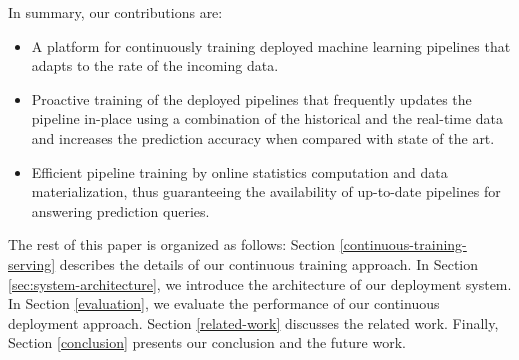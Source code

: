 In summary, our contributions are:
\begin{itemize}
\item A platform for continuously training deployed machine learning pipelines that adapts to the rate of the incoming data.
\item Proactive training of the deployed pipelines that frequently updates the pipeline in-place using a combination of the historical and the real-time data and increases the prediction accuracy when compared with state of the art.
\item Efficient pipeline training by online statistics computation and data materialization, thus guaranteeing the availability of up-to-date pipelines for answering prediction queries.
\end{itemize}

The rest of this paper is organized as follows:
Section \ref{continuous-training-serving} describes the details of our continuous training approach.
In Section \ref{sec:system-architecture}, we introduce the architecture of our deployment system.
In Section \ref{evaluation}, we evaluate the performance of our continuous deployment approach.
Section \ref {related-work} discusses the related work.
Finally, Section \ref{conclusion} presents our conclusion and the future work.
